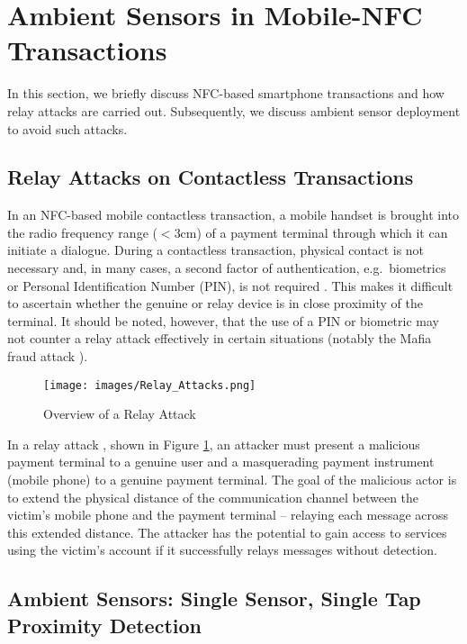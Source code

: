 \documentclass[runningheads,a4paper]{llncs}
\begin{document}
\section{Ambient Sensors in Mobile-NFC Transactions}
\label{AmbientSensorinMobile-NFCTransaction}
In this section, we briefly discuss NFC-based smartphone transactions and how relay attacks are carried out. Subsequently, we discuss ambient sensor deployment to avoid such attacks. 

\subsection{Relay Attacks on Contactless Transactions}
\label{sec:Relay-Attacks-on-Contactless-Transactions}
In an NFC-based mobile contactless transaction, a mobile handset is brought into the radio frequency range ($<$3cm) of a payment terminal through which it can initiate a dialogue.  During a contactless transaction, physical contact is not necessary and, in many cases, a second factor of authentication, e.g.\ biometrics or Personal Identification Number (PIN), is not required \cite{EVM2015-ContactlessArchitectureReq}. This makes it difficult to ascertain whether the genuine or relay device is in close proximity of the terminal. It should be noted, however, that the use of a PIN or biometric may not counter a relay attack effectively in certain situations (notably the Mafia fraud attack \cite{Cremers2012}).

\begin{figure}[ht]
	\centering
		\texttt{[image: images/Relay\_Attacks.png]}
	\caption{Overview of a Relay Attack}
	\label{fig:relay_attack}
\end{figure}

In a relay attack \cite{Francis:2010:PNP:1926325.1926331,FrancisHMM11,5741305}, shown in Figure \ref{fig:relay_attack}, an attacker must present a malicious payment terminal to a genuine user and a masquerading payment instrument (mobile phone) to a genuine payment terminal.  The goal of the malicious actor is to extend the physical distance of the communication channel between the victim's mobile phone and the payment terminal -- relaying each message across this extended distance.  The attacker has the potential to gain access to services using the victim's account if it successfully relays messages without detection.

\subsection{Ambient Sensors: Single Sensor, Single Tap Proximity Detection}
\label{sec:Ambient-Sensors-Single-Sensor-Single-Tap-Proximity-Detection}
\end{document}
